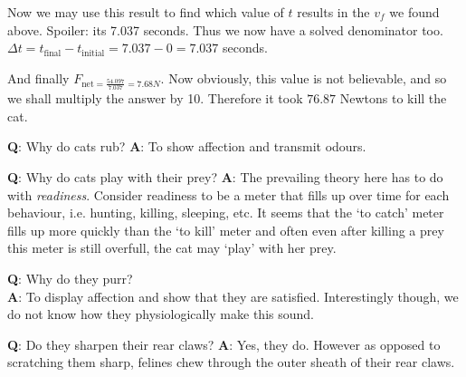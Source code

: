 \documentclass{article}
\begin{document}
\begin{multicols}{3}
\begin{minipage}{8cm}
{\begin{minipage}{8cm}
        Now we may use this result to find which value of $t$ results in the $v_f$ we found above. Spoiler: its 7.037 seconds. Thus we now have a solved denominator too. $\Delta t = t_{\text{final}} - t_{\text{initial}} = 7.037 - 0 = 7.037$ seconds.

        And finally $F_{\text{net} = \frac{54.097}{7.037} = 7.68 N}$. Now obviously, this value is not believable, and so we shall multiply the answer by 10. Therefore it took $76.87$ Newtons to kill the cat. 
        \flushright{$\square$}

        

    \end{minipage}
    }

\end{minipage}

\hspace{2.5cm}
    \begin{minipage}{0.5cm}
        \begin{turn}{90}
            \textbf{Q}: Why do cats rub?
            \textbf{A}: To show affection and transmit odours.
        \end{turn}
    \end{minipage}

\hspace{-2.5cm}
\begin{minipage}{8cm}
    \textbf{Q}: Why do cats play with their prey?
    \textbf{A}: The prevailing theory here has to do with \emph{readiness}. Consider readiness to be a meter that fills up over time for each behaviour, i.e. hunting, killing, sleeping, etc. It seems that the `to catch' meter fills up more quickly than the `to kill' meter and often even after killing a prey this meter is still overfull, the cat may `play' with her prey.\\
    \begin{turn}{90}
    \begin{minipage}[b]{6.5cm}
        \flushleft
        \textbf{Q}: Why do they purr?\\
        \vspace{3cm}
        \flushright
        \textbf{A}: To display affection and show that they are satisfied. Interestingly though, we do not know how they physiologically make this sound.
    \end{minipage}
    \end{turn}
    \begin{minipage}[b]{7cm}
        \textbf{Q}: Do they sharpen their rear claws?
        \textbf{A}: Yes, they do. However as opposed to scratching them sharp, felines chew through the outer sheath of their rear claws.
    \end{minipage}
\end{minipage}


\end{multicols}
\end{document}
